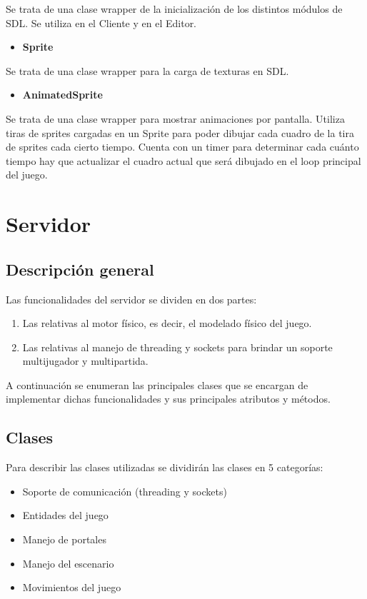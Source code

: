 \documentclass[a4paper]{article}
\begin{document}
Se trata de una clase wrapper de la inicialización de los distintos módulos de SDL. Se utiliza en el Cliente y en el Editor.

\begin{itemize}
	\item \textbf{Sprite}
\end{itemize}

Se trata de una clase wrapper para la carga de texturas en SDL.

\begin{itemize}
	\item \textbf{AnimatedSprite}
\end{itemize}

Se trata de una clase wrapper para mostrar animaciones por pantalla. Utiliza tiras de sprites cargadas en un Sprite para poder dibujar cada cuadro de la tira de sprites cada cierto tiempo.
Cuenta con un timer para determinar cada cuánto tiempo hay que actualizar el cuadro actual que será dibujado en el loop principal del juego.

\section{Servidor}

\subsection{Descripción general}
Las funcionalidades del servidor se dividen en dos partes:
\begin{enumerate}
	\item Las relativas al motor físico, es decir, el modelado físico del juego.
	\item Las relativas al manejo de threading y sockets para brindar un soporte multijugador y multipartida.
\end{enumerate}

A continuación se enumeran las principales clases que se encargan de implementar dichas funcionalidades y sus principales atributos y métodos.

\subsection{Clases}

Para describir las clases utilizadas se dividirán las clases en 5 categorías:
\begin{itemize}
	\item Soporte de comunicación (threading y sockets)
	\item Entidades del juego
	\item Manejo de portales
	\item Manejo del escenario
	\item Movimientos del juego
\end{itemize} 
\end{document}
